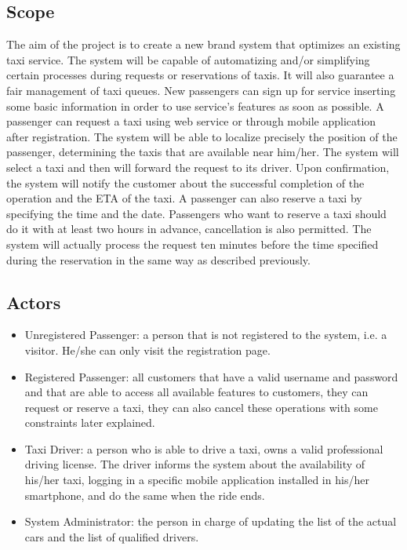 \documentclass[a4paper,12pt]{article}%
\begin{document}
\subsection{Scope}
The aim of the project is to create a new brand system that optimizes an 
existing taxi service.
The system will be capable of automatizing  and/or simplifying certain 
processes during requests or reservations of taxis.
It will also guarantee a fair management of taxi queues.
New passengers can sign up for service inserting some basic information in order to use service's features as soon as possible.
A passenger can request a taxi using web service or through mobile
application after registration. The system will be able to localize precisely the position
of the passenger, determining the taxis that are available near
him/her. The system will select a taxi and then will forward the request to its driver.
Upon confirmation, the system will notify the customer about the successful completion of the operation and the ETA of the taxi. A passenger can also reserve a taxi by specifying the time and the date.
Passengers who want to reserve a taxi should do it with at least two hours in advance, cancellation is also permitted. The system will actually process the request ten minutes before the time specified during the reservation in the same way as described previously.

\subsection{Actors}
\begin{itemize}
\item Unregistered Passenger: a person that is not registered to the system, i.e. a visitor. He/she can only visit the registration page.
\item Registered Passenger: all customers that have a valid username and password and that are able to access all available features to customers, they can request or reserve a taxi, they can also cancel these operations with some constraints later explained.
\item Taxi Driver: a person who is able to drive a taxi, owns a valid 
professional driving license. The driver informs the system about the availability of his/her taxi, logging in a specific mobile application installed in his/her smartphone, and do the same when the ride ends. 
\item System Administrator: the person in charge of updating the list of the actual cars and the list of qualified drivers.
\end{itemize}
\end{document}
